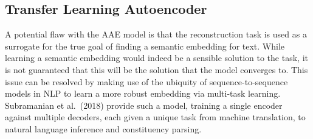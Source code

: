 \documentclass[12pt,a4paper]{article}
\begin{document}










\subsection{Transfer Learning Autoencoder}

\noindent A potential flaw with the AAE model is that the reconstruction task is used as a surrogate for the true goal of finding a semantic embedding for text. While learning a semantic embedding would indeed be a sensible solution to the task, it is not guaranteed that this will be the solution that the model converges to. This issue can be resolved by making use of the ubiquity of sequence-to-sequence models in NLP to learn a more robust embedding via multi-task learning. Subramanian et al.\ (2018)\nocite{transfer} provide such a model, training a single encoder against multiple decoders, each given a unique task from machine translation, to natural language inference and constituency parsing. 
\end{document}

